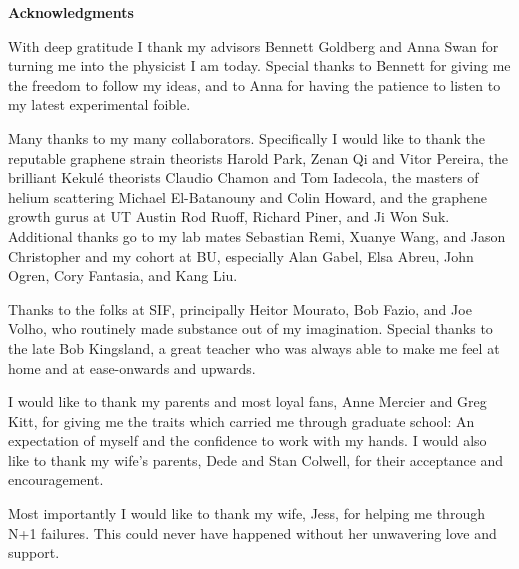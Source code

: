 \begin{center}
\textbf{Acknowledgments} 
\end{center}
With deep gratitude I thank my advisors Bennett Goldberg and Anna Swan for turning me into the physicist I am today.
Special thanks to Bennett for giving me the freedom to follow my ideas, and to Anna for having the patience to listen to my latest experimental foible.

Many thanks to my many collaborators.
Specifically I would like to thank the reputable graphene strain theorists Harold Park, Zenan Qi and Vitor Pereira, the brilliant Kekul\'e theorists Claudio Chamon and Tom Iadecola, the masters of helium scattering Michael El-Batanouny and Colin Howard, and the graphene growth gurus at UT Austin Rod Ruoff, Richard Piner, and Ji Won Suk.
Additional thanks go to my lab mates Sebastian Remi, Xuanye Wang, and Jason Christopher and my cohort at BU, especially Alan Gabel, Elsa Abreu, John Ogren, Cory Fantasia, and Kang Liu.

Thanks to the folks at SIF, principally Heitor Mourato, Bob Fazio, and Joe Volho, who routinely made substance out of my imagination.
Special thanks to the late Bob Kingsland, a great teacher who was always able to make me feel at home and at ease-onwards and upwards.

I would like to thank my parents and most loyal fans, Anne Mercier and Greg Kitt, for giving me the traits which carried me through graduate school: An expectation of myself and the confidence to work with my hands.
I would also like to thank my wife's parents, Dede and Stan Colwell, for their acceptance and encouragement.

Most importantly I would like to thank my wife, Jess, for helping me through N+1 failures.
This could never have happened without her unwavering love and support.

\newpage